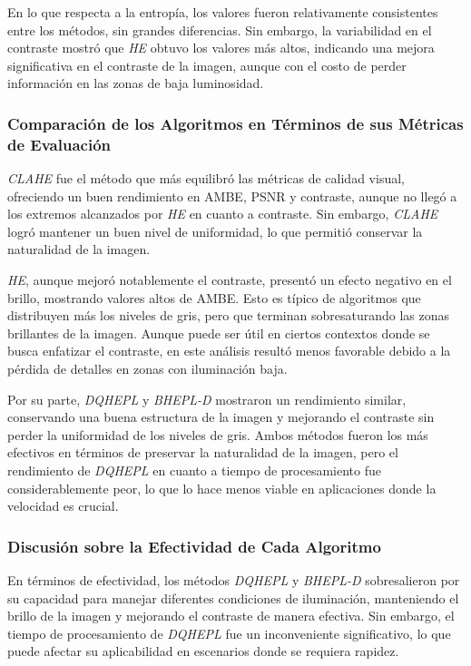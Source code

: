 \documentclass[sigchi]{acmart}
\begin{document}
En lo que respecta a la entropía, los valores fueron relativamente consistentes entre los
métodos, sin grandes diferencias. Sin embargo, la variabilidad en el contraste mostró que
\emph{HE} obtuvo los valores más altos, indicando una mejora significativa en el contraste de
la imagen, aunque con el costo de perder información en las zonas de baja luminosidad.

\subsubsection{\textbf{Comparación de los Algoritmos en Términos de sus Métricas de Evaluación}}

\emph{CLAHE} fue el método que más equilibró las métricas de calidad visual, ofreciendo un
buen rendimiento en AMBE, PSNR y contraste, aunque no llegó a los extremos alcanzados por
\emph{HE} en cuanto a contraste. Sin embargo, \emph{CLAHE} logró mantener un buen nivel de
uniformidad, lo que permitió conservar la naturalidad de la imagen.

\emph{HE}, aunque mejoró notablemente el contraste, presentó un efecto negativo en el brillo,
mostrando valores altos de AMBE. Esto es típico de algoritmos que distribuyen más los niveles
de gris, pero que terminan sobresaturando las zonas brillantes de la imagen. Aunque puede ser
útil en ciertos contextos donde se busca enfatizar el contraste, en este análisis resultó menos
favorable debido a la pérdida de detalles en zonas con iluminación baja.

Por su parte, \emph{DQHEPL} y \emph{BHEPL-D} mostraron un rendimiento similar, conservando
una buena estructura de la imagen y mejorando el contraste sin perder la uniformidad de los
niveles de gris. Ambos métodos fueron los más efectivos en términos de preservar la naturalidad
de la imagen, pero el rendimiento de \emph{DQHEPL} en cuanto a tiempo de procesamiento fue
considerablemente peor, lo que lo hace menos viable en aplicaciones donde la velocidad es
crucial.

\subsubsection{\textbf{Discusión sobre la Efectividad de Cada Algoritmo}}

En términos de efectividad, los métodos \emph{DQHEPL} y \emph{BHEPL-D} sobresalieron por su
capacidad para manejar diferentes condiciones de iluminación, manteniendo el brillo de la
imagen y mejorando el contraste de manera efectiva. Sin embargo, el tiempo de procesamiento de
\emph{DQHEPL} fue un inconveniente significativo, lo que puede afectar su aplicabilidad en
escenarios donde se requiera rapidez.
\end{document}
